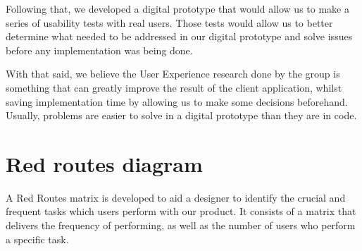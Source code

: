 \documentclass[a4paper,twoside,10pt]{report}
\begin{document}
Following that, we developed a digital prototype that would allow us to make a series of usability tests with real users. Those tests would allow us to better determine what needed to be addressed in our digital prototype and solve issues before any implementation was being done.

With that said, we believe the User Experience research done by the group is something that can greatly improve the result of the client application, whilst saving implementation time by allowing us to make some decisions beforehand. Usually, problems are easier to solve in a digital prototype than they are in code.

\section{Red routes diagram}
A  Red Routes matrix is developed to aid a designer to identify the crucial and frequent tasks which users perform with our product. It consists of a matrix that delivers the frequency of performing,  as well as the number of users who perform a specific task.
 
\end{document}
